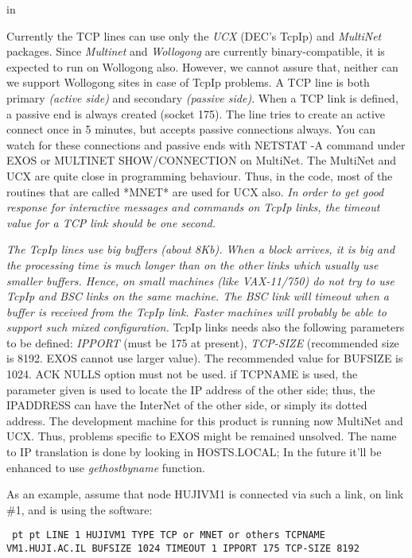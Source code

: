  in

Currently the TCP lines can use only the {\sl UCX} (DEC's TcpIp)  and
{\sl MultiNet}  packages. Since {\sl Multinet} and {\sl Wollogong} are currently
binary-compatible, it is expected to run on Wollogong also. However,  we
cannot  assure  that,  neither can we support Wollogong sites in case of
TcpIp problems. A TCP line is both primary {\sl (active side)}  and  secondary
{\sl (passive  side)}.  When  a  TCP  link is defined, a passive end is always
created (socket 175). The line tries to create an active connect once in
5  minutes,  but  accepts  passive connections always. You can watch for
these connections and passive ends with NETSTAT -A command under EXOS or
MULTINET SHOW/CONNECTION on MultiNet.
The  MultiNet and UCX are quite close in programming behaviour. Thus,
in the code, most of the routines that are called *MNET*  are  used  for
UCX also.
{\sl In  order  to get good response for interactive messages and commands
on TcpIp links, the timeout value for a TCP link should be one second.}

{\sl The TcpIp lines use big buffers (about 8Kb). When a block arrives, it
is  big  and  the processing time is much longer than on the other links
which usually use  smaller  buffers.  Hence,  on  small  machines  (like
VAX-11/750)  do  not try to use TcpIp and BSC links on the same machine.
The BSC link will timeout when a buffer is received from the TcpIp link.
Faster   machines   will   probably   be  able  to  support  such  mixed
configuration.}
TcpIp links needs also the following parameters to be defined: {\sl IPPORT}
{\ncrBold (must  be  175  at  present)}, {\sl TCP-SIZE}
(recommended size is 8192. EXOS
cannot use larger value). The recommended value  for  BUFSIZE  is  1024.
{\ncrBold ACK NULLS  option  must  not  be used}.
if TCPNAME is used, the parameter
given is used to locate the IP address of  the  other  side;  thus,  the
IPADDRESS  can have the InterNet of the other side, or simply its dotted
address.
The development machine for this product is running now MultiNet  and
UCX. Thus, problems specific to EXOS might be remained unsolved.
{\ncrBold The  name to IP translation is done by looking in HOSTS.LOCAL; In the
future it'll be enhanced to use {\sl gethostbyname} function.}

As an example, assume that node HUJIVM1 is connected via such a link,
on link \#1, and is using the  software:

{\obeylines\obeyspaces\tt{} pt  pt
LINE  1  HUJIVM1
TYPE TCP or MNET or others
TCPNAME VM1.HUJI.AC.IL
BUFSIZE  1024
TIMEOUT  1
IPPORT  175
TCP-SIZE  8192
}

